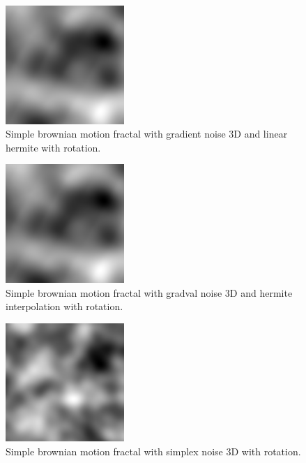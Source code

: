 \begin{figure}[h]
\centering
\includegraphics[width=0.4\textwidth]{out/simplefBm3/simplefBm3_gradient_noise3D_hermiteInterp_rot.png}
\caption{Simple brownian motion fractal with gradient noise 3D and linear hermite with rotation.}
\label{fig:simple_bm3_gradient_noise3D_hermiteInterp_rot}
\end{figure}

\begin{figure}[h]
\centering
\includegraphics[width=0.4\textwidth]{out/simplefBm3/simplefBm3_gradval_noise3D_hermiteInterp_rot.png}
\caption{Simple brownian motion fractal with gradval noise 3D and hermite interpolation with rotation.}
\label{fig:simple_bm3_gradval_noise3D_hermiteInterp_rot}
\end{figure}

\begin{figure}[h]
\centering
\includegraphics[width=0.4\textwidth]{out/simplefBm3/simplefBm3_simplex_noise3D_noInterp_rot.png}
\caption{Simple brownian motion fractal with simplex noise 3D with rotation.}
\label{fig:simple_bm3_simplex_noise3D_noInterp_rot}
\end{figure}

